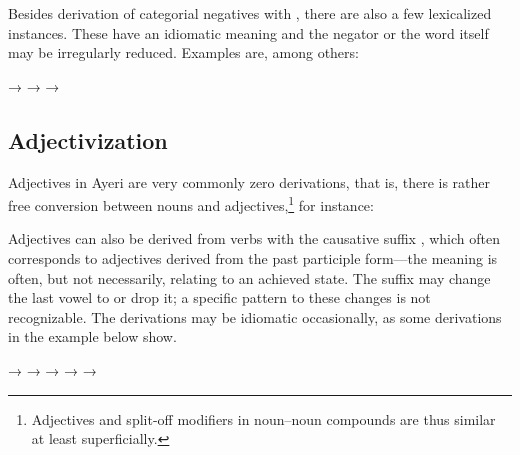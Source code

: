 Besides  derivation of categorial negatives with , 
there are also a few lexicalized instances. These have an idiomatic meaning and 
the negator or the word itself may be irregularly reduced. Examples are, among 
others:

\pex
	\a {}
		→ 
	\a {}
		→ 
	\a {}
		→ 
\xe


\subsection{Adjectivization}

Adjectives in Ayeri are very commonly zero derivations, that is, 
there is rather free conversion between nouns and 
adjectives,\footnote{Adjectives and split-off modifiers in noun--noun compounds 
are thus similar at least superficially.} for instance:

\pex
	\a {}
		\til{} 
	\a {}
		\til{} 
	\a {}
		\til{} 
	\a {}
		\til{} 
	\a {}
		\til{} 
\xe

Adjectives can also be derived from verbs with the causative suffix 
, which often corresponds to adjectives derived from the 
past participle form---the meaning is often, but not necessarily, relating to 
an achieved state. The suffix may change the last vowel to  or drop 
it; a specific pattern to these changes is not recognizable. The derivations 
may be idiomatic occasionally, as some derivations in the example below show.

\pex
	\a {}
		→ 
	\a {}
		→ 
	\a {}
		→ 
	\a {}
		→ 
	\a {}
		→ 
\xe

